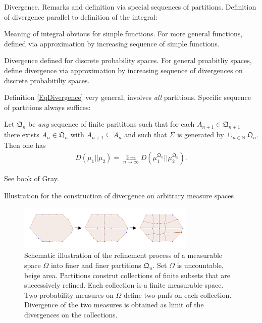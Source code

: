 \begin{frame} {Divergence. Remarks and definition via special sequences of partitions.}
Definition of divergence parallel to definition of the integral: 
\bit 
\item Meaning of integral obvious for simple functions. For more general functions, defined via approximation by increasing sequence of simple functions.
\item Divergence defined for discrete probability spaces. For general proabitliy spaces, define divergence via approximation by increasing sequence of divergences on discrete probabitiliy spaces.   
\eit

Definition \eqref{EqDivergence} very general, involves \textit{all} partitions.  Specific sequence 
of partitions always suffices:

\begin{proposition}
Let $\mathfrak{Q}_n$ be \textit{any} sequence of finite parititons such that for each $A_{n+1}\in\mathfrak{Q}_{n+1}$ there exists $A_n\in\mathfrak{Q}_n$ with $A_{n+1}\subseteq A_n$ and 
such that $\Sigma$ is generated by $\cup_{n\in\mathbb{N}}\mathfrak{Q}_n$. Then one has 
\begin{align*}
D(\mu_1||\mu_2)=\lim_{n\to\infty} D(\mu_1^{\mathfrak{Q}_n}||\mu_2^{\mathfrak{Q}_n}).
\end{align*}
\end{proposition}
 See book of Gray. 
\end{frame}


\begin{frame}{Illustration for the construction of divergence on arbitrary measure spaces} 
\begin{figure}
\centering
\includegraphics[width=0.75\textwidth]{RD_V/non_uniform_all_2.png}
\captionsetup{labelformat=empty}
\caption{Schematic illustration of the refinement process of a measurable space $\Omega$ into finer and finer partitions $\mathfrak{Q}_n$.
Set $\Omega$ is uncountable, beige area. Partitions construt collections of finite subsets that are successively refined. Each collection is a finite 
measurable space. Two probability measures on $\Omega$ define two pmfs on each collection. Divergence of the two measures 
is obtained as limit of the divergences on the collections. }
\end{figure}
\end{frame} 



